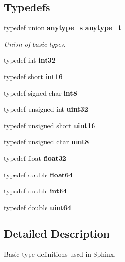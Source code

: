 \subsection*{Typedefs}
\begin{DoxyCompactItemize}
\item 
typedef union {\bf anytype\+\_\+s} {\bf anytype\+\_\+t}\label{prim__type_8h_a98bfefef272895ed1506502cdb8c1aa3}

\begin{DoxyCompactList}\small\item\em Union of basic types. \end{DoxyCompactList}\item 
typedef int {\bfseries int32}\label{prim__type_8h_a56f1a81c92849566ae864511088eb7e8}

\item 
typedef short {\bfseries int16}\label{prim__type_8h_a4355d16fcf9f644c9ac84293f0b1801f}

\item 
typedef signed char {\bfseries int8}\label{prim__type_8h_a1b956fe1df85f3c132b21edb4e116458}

\item 
typedef unsigned int {\bfseries uint32}\label{prim__type_8h_a1134b580f8da4de94ca6b1de4d37975e}

\item 
typedef unsigned short {\bfseries uint16}\label{prim__type_8h_a05f6b0ae8f6a6e135b0e290c25fe0e4e}

\item 
typedef unsigned char {\bfseries uint8}\label{prim__type_8h_adde6aaee8457bee49c2a92621fe22b79}

\item 
typedef float {\bfseries float32}\label{prim__type_8h_aacdc525d6f7bddb3ae95d5c311bd06a1}

\item 
typedef double {\bfseries float64}\label{prim__type_8h_a232fad1b0d6dcc7c16aabde98b2e2a80}

\item 
typedef double {\bfseries int64}\label{prim__type_8h_a5ca2adc31be9c44adfeb373feb166821}

\item 
typedef double {\bfseries uint64}\label{prim__type_8h_a521337cd39452f9e318a6a3c3f6694ca}

\end{DoxyCompactItemize}


\subsection{Detailed Description}
Basic type definitions used in Sphinx. 

